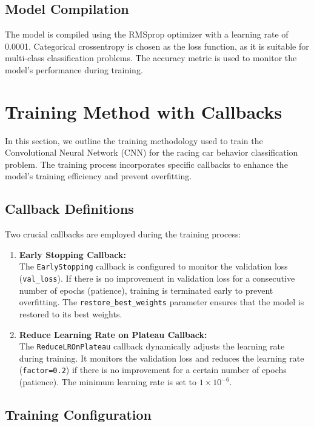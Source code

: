\documentclass{article}
\begin{document}
\subsection{Model Compilation}

The model is compiled using the RMSprop optimizer with a learning rate of 0.0001. Categorical crossentropy is chosen as the loss function, as it is suitable for multi-class classification problems. The accuracy metric is used to monitor the model's performance during training.

\section{Training Method with Callbacks}

In this section, we outline the training methodology used to train the Convolutional Neural Network (CNN) for the racing car behavior classification problem. The training process incorporates specific callbacks to enhance the model's training efficiency and prevent overfitting.

\subsection{Callback Definitions}

Two crucial callbacks are employed during the training process:

\begin{enumerate}
    \item \textbf{Early Stopping Callback:} \\
          The \texttt{EarlyStopping} callback is configured to monitor the validation loss (\texttt{val\_loss}). If there is no improvement in validation loss for a consecutive number of epochs (patience), training is terminated early to prevent overfitting. The \texttt{restore\_best\_weights} parameter ensures that the model is restored to its best weights.

    \item \textbf{Reduce Learning Rate on Plateau Callback:} \\
          The \texttt{ReduceLROnPlateau} callback dynamically adjusts the learning rate during training. It monitors the validation loss and reduces the learning rate (\texttt{factor=0.2}) if there is no improvement for a certain number of epochs (patience). The minimum learning rate is set to \(1 \times 10^{-6}\).
\end{enumerate}

\subsection{Training Configuration}
\end{document}
